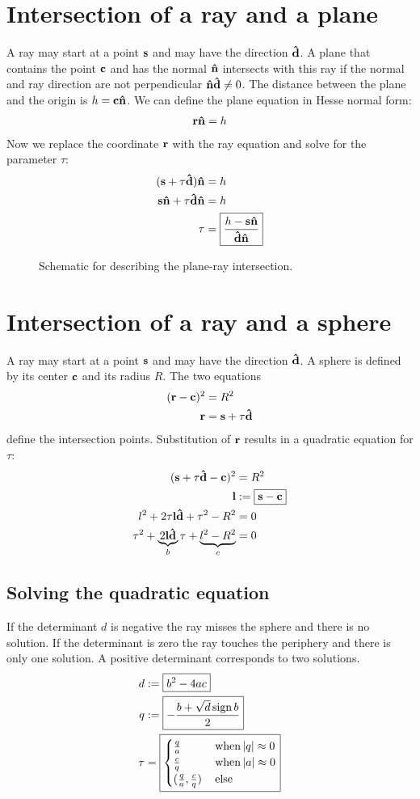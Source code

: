 \section{Intersection of a ray and a plane}
A ray may start at a point $\mathbf{s}$ and may have the direction $\mathbf{\hat{d}}$.  A
plane that contains the point $\mathbf{c}$ and has the normal $\mathbf{\hat{n}}$ intersects
with this ray if the normal and ray direction are not perpendicular
$\mathbf{\hat{n}}\mathbf{\hat{d}}\not=0$. The distance between the plane and the origin is
$h=\mathbf{c}\mathbf{\hat{n}}$. We can define the plane equation in Hesse normal form:  
\begin{align}
  \mathbf{r}\mathbf{\hat{n}}=h
\end{align}
Now we replace the coordinate $\mathbf{r}$ with the ray equation and solve for
the parameter $\tau$:
\begin{align}
  (\mathbf{s}+\tau\mathbf{\hat{d}})\mathbf{\hat{n}}&=h\\
  \mathbf{s}\mathbf{\hat{n}}+\tau\mathbf{\hat{d}}\mathbf{\hat{n}}&=h\\
  \tau&=\boxed{\frac{h-\mathbf{s}\mathbf{\hat{n}}}{\mathbf{\hat{d}}\mathbf{\hat{n}}}}
\end{align}
 \begin{figure}[!hbt]
   \centering
   
   \caption{Schematic for describing the plane-ray intersection.}
 \end{figure}
\section{Intersection of a ray and a sphere}
A ray may start at a point $\mathbf{s}$ and may have the direction $\mathbf{\hat{d}}$.  A
sphere is defined by its center $\mathbf{c}$ and its radius $R$.  The two
equations
\begin{align}
  (\mathbf{r}-\mathbf{c})^2&=R^2\\
  \mathbf{r}&=\mathbf{s}+\tau\mathbf{\hat{d}}
\end{align}
define the intersection points. Substitution of $\mathbf{r}$ results in a
quadratic equation for $\tau$:
\begin{align}
  (\mathbf{s}+\tau\mathbf{\hat{d}}-\mathbf{c})^2&=R^2\\
  \mathbf{l}&:=\boxed{\mathbf{s}-\mathbf{c}}\\
  l^2+2\tau\mathbf{l}\mathbf{\hat{d}}+\tau^2-R^2&=0\\
  \tau^2+\underbrace{2\mathbf{l}\mathbf{\hat{d}}}_b\tau+\underbrace{l^2-R^2}_c&=0
\end{align}
\subsection{Solving the quadratic equation}
If the determinant $d$ is negative the ray misses the sphere and there
is no solution. If the determinant is zero the ray touches the
periphery and there is only one solution. A positive determinant
corresponds to two solutions.
\begin{align}
  d&:=\boxed{b^2-4ac}\\
  q&:=\boxed{-\frac{b+\sqrt{d}\operatorname{sign} b}{2}}\\
  \tau&=\boxed{
  \begin{cases}
    \frac{q}{a} &\,\textrm{when}\,\mathopen| q \mathclose|\approx 0\\ 
    \frac{c}{q} &\,\textrm{when}\,\mathopen| a \mathclose|\approx 0\\
    (\frac{q}{a}, \frac{c}{q}) &\,\textrm{else}
  \end{cases}}
\end{align}
